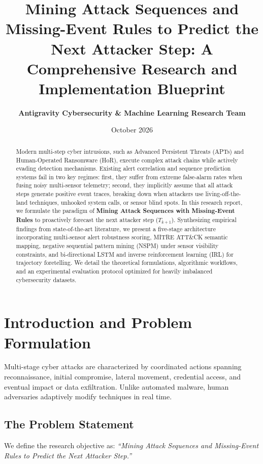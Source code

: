 \documentclass[11pt,a4paper]{article}
\title{\textbf{Mining Attack Sequences and Missing-Event Rules to Predict the Next Attacker Step: A Comprehensive Research and Implementation Blueprint}}
\author{\textbf{Antigravity Cybersecurity \& Machine Learning Research Team}}
\date{October 2026}
\begin{document}
\maketitle

\begin{abstract}
Modern multi-step cyber intrusions, such as Advanced Persistent Threats (APTs) and Human-Operated Ransomware (HoR), execute complex attack chains while actively evading detection mechanisms. Existing alert correlation and sequence prediction systems fail in two key regimes: first, they suffer from extreme false-alarm rates when fusing noisy multi-sensor telemetry; second, they implicitly assume that all attack steps generate positive event traces, breaking down when attackers use living-off-the-land techniques, unhooked system calls, or sensor blind spots. In this research report, we formulate the paradigm of \textbf{Mining Attack Sequences with Missing-Event Rules} to proactively forecast the next attacker step ($T_{k+1}$). Synthesizing empirical findings from state-of-the-art literature, we present a five-stage architecture incorporating multi-sensor alert robustness scoring, MITRE ATT\&CK semantic mapping, negative sequential pattern mining (NSPM) under sensor visibility constraints, and bi-directional LSTM and inverse reinforcement learning (IRL) for trajectory foretelling. We detail the theoretical formulations, algorithmic workflows, and an experimental evaluation protocol optimized for heavily imbalanced cybersecurity datasets.
\end{abstract}

\section{Introduction and Problem Formulation}
Multi-stage cyber attacks are characterized by coordinated actions spanning reconnaissance, initial compromise, lateral movement, credential access, and eventual impact or data exfiltration. Unlike automated malware, human adversaries adaptively modify techniques in real time.

\subsection{The Problem Statement}
We define the research objective as: \emph{``Mining Attack Sequences and Missing-Event Rules to Predict the Next Attacker Step.''}
\end{document}
